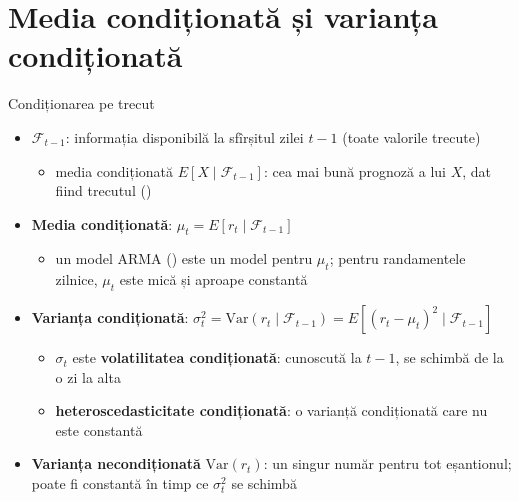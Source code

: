 \section{Media condiționată și varianța condiționată}

\begin{frame}{Condiționarea pe trecut}
\itemsize{\small}
\begin{itemize}
    \item $\mathcal{F}_{t-1}$: informația disponibilă la sfîrșitul zilei $t-1$ (toate valorile trecute)
    \begin{itemize}
        \item media condiționată $E[X \mid \mathcal{F}_{t-1}]$: cea mai bună prognoză a lui $X$, dat fiind trecutul ()
    \end{itemize}
    \item \textbf{Media condiționată}: $\mu_t = E[r_t \mid \mathcal{F}_{t-1}]$
    \begin{itemize}
        \item un model ARMA () este un model pentru $\mu_t$; pentru randamentele zilnice, $\mu_t$ este mică și aproape constantă
    \end{itemize}
    \item \textbf{Varianța condiționată}: $\sigma_t^2 = \mathrm{Var}(r_t \mid \mathcal{F}_{t-1}) = E[(r_t - \mu_t)^2 \mid \mathcal{F}_{t-1}]$
    \begin{itemize}
        \item $\sigma_t$ este \textbf{volatilitatea condiționată}: cunoscută la $t-1$, se schimbă de la o zi la alta
        \item \textbf{heteroscedasticitate condiționată}: o varianță condiționată care nu este constantă
    \end{itemize}
    \item \textbf{Varianța necondiționată} $\mathrm{Var}(r_t)$: un singur număr pentru tot eșantionul; poate fi constantă în timp ce $\sigma_t^2$ se schimbă
\end{itemize}
\end{frame}

